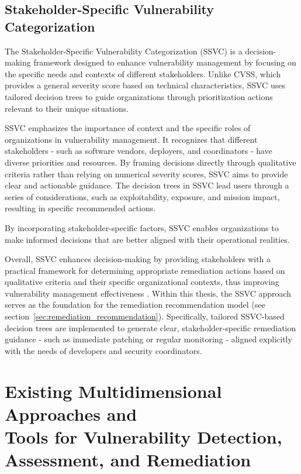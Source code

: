 \subsection{Stakeholder-Specific Vulnerability Categorization}
\label{subsec:stakeholder-specific-vulnerability}

The Stakeholder-Specific Vulnerability Categorization (\ac{SSVC}) is a decision-making framework designed to enhance vulnerability management by focusing on the specific needs and contexts of different stakeholders. Unlike \ac{CVSS}, which provides a general severity score based on technical characteristics, \ac{SSVC} uses tailored decision trees to guide organizations through prioritization actions relevant to their unique situations.

\ac{SSVC} emphasizes the importance of context and the specific roles of organizations in vulnerability management. It recognizes that different stakeholders  -  such as software vendors, deployers, and coordinators  -  have diverse priorities and resources. By framing decisions directly through qualitative criteria rather than relying on numerical severity scores, \ac{SSVC} aims to provide clear and actionable guidance. The decision trees in \ac{SSVC} lead users through a series of considerations, such as exploitability, exposure, and mission impact, resulting in specific recommended actions.

By incorporating stakeholder-specific factors, \ac{SSVC} enables organizations to make informed decisions that are better aligned with their operational realities.

Overall, \ac{SSVC} enhances decision-making by providing stakeholders with a practical framework for determining appropriate remediation actions based on qualitative criteria and their specific organizational contexts, thus improving vulnerability management effectiveness \autocite{spring_prioritizing_2021}. Within this thesis, the \ac{SSVC} approach serves as the foundation for the remediation recommendation model (see section~\ref{sec:remediation_recommendation}). Specifically, tailored \ac{SSVC}-based decision trees are implemented to generate clear, stakeholder-specific remediation guidance - such as immediate patching or regular monitoring - aligned explicitly with the needs of developers and security coordinators.

\section{Existing Multidimensional Approaches and \\ Tools for Vulnerability Detection, \\ Assessment, and Remediation}
\label{sec:multidimensional-approaches-tools}

